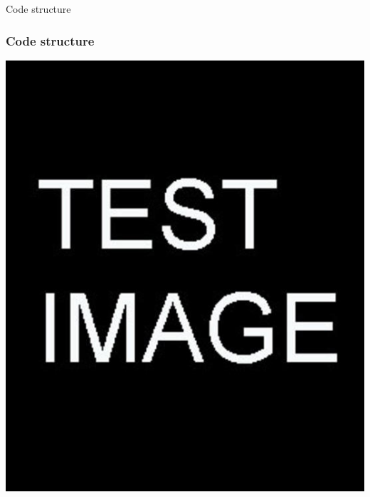 \documentclass{beamer}
\begin{document}
\begin{frame} %
	Code structure %
\end{frame}


\begin{frame} %
	\frametitle{Code structure}
	\includegraphics[scale=0.3]{etc/test.jpg}
\end{frame}
\end{document}
